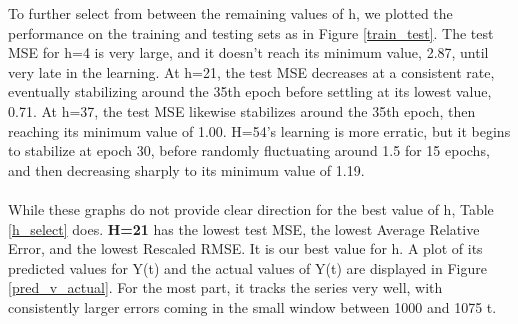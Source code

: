 \documentclass{homework}
\begin{document}
To further select from between the remaining values of h, we plotted the performance on the training and testing sets as in Figure \ref{train_test}. The test MSE for h=4 is very large, and it doesn't reach its minimum value, 2.87, until very late in the learning. At h=21, the test MSE decreases at a consistent rate, eventually stabilizing around the 35th epoch before settling at its lowest value, 0.71. At h=37, the test MSE likewise stabilizes around the 35th epoch, then reaching its minimum value of 1.00. H=54's learning is more erratic, but it begins to stabilize at epoch 30, before randomly fluctuating around 1.5 for 15 epochs, and then decreasing sharply to its minimum value of 1.19.\\\\
While these graphs do not provide clear direction for the best value of h, Table \ref{h_select} does. \textbf{H=21} has the lowest test MSE, the lowest Average Relative Error, and the lowest Rescaled RMSE. It is our best value for h. A plot of its predicted values for Y(t) and the actual values of Y(t) are displayed in Figure \ref{pred_v_actual}. For the most part, it tracks the series very well, with consistently larger errors coming in the small window between 1000 and 1075 t.
\end{document}
